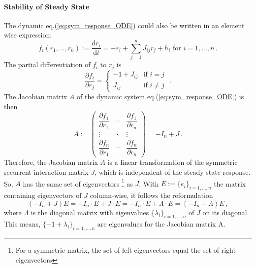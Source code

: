 \documentclass[11pt]{article}
\begin{document}
	\paragraph{Stability of Steady State}
	The dynamic eq.(\ref{eq:sym_response_ODE}) could also be written in an element wise expression:
		\begin{equation}
			 f_i (r_1, ..., r_n) := \frac{\mathrm{d} r_i}{\mathrm{d} t} = - r_i + \sum_{j=1}^{n} J_{ij} r_j + h_i  \text{   for } i = 1, ..., n\, .
		\end{equation}
	The partial differentiation of $f_i$ to $r_j$ is
		\begin{equation}
			\frac{\partial f_i}{\partial r_j} = 
			\begin{cases}
				-1 + J_{ij} & \text{if} \, \,  i = j \\
				J_{ij} & \text{if} \, \, i \neq j
			\end{cases} \, \, .
		\end{equation}
	The Jacobian matrix $A$ of the dynamic system eq.(\ref{eq:sym_response_ODE}) is then
		\begin{equation} \label{eq:Jacobian_matrix}
			A := 
			 \begin{pmatrix}
				\dfrac{\partial f_1}{\partial r_1} & \cdots & \dfrac{\partial f_1}{\partial r_n}\\
				\vdots                             & \ddots & \vdots\\
				\dfrac{\partial f_n}{\partial r_1} & \cdots & \dfrac{\partial f_n}{\partial r_n}
			\end{pmatrix}
			= - I_n + J \, .
		\end{equation}
	Therefore, the Jacobian matrix $A$ is a linear transformation of the symmetric recurrent interaction matrix $J$, which is independent of the steady-state response. So, $A$ has the same set of eigenvectors \footnote{For a symmetric matrix, the set of left eigenvectors equal the set of right eigenvectors} as $J$. With $E := \{e_i\}_{i = 1, ..., n}$ the matrix containing eigenvectors of $J$ column-wise, it follows the reformulation 
		\begin{equation} \label{eq:steady_state_eigenvalues_sym}
			(- I_n + J) E = - I_n \cdot E + J \cdot E = -I_n \cdot E + \Lambda \cdot E = (-I_n + \Lambda) E \, ,
		\end{equation}
	where $\Lambda$ is the diagonal matrix with eigenvalues $\{\lambda_i\}_{i = 1,...,n}$ of $J$ on its diagonal. This means, $\{-1 + \lambda_i\}_{i=1, ..., n}$ are eigenvalues for the Jacobian matrix A. 
	
\end{document}
